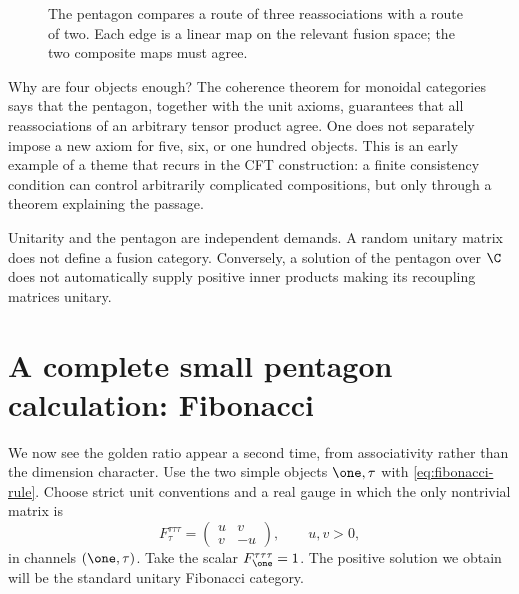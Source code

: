 \begin{figure}[htbp]
\centering
{}
\caption{The pentagon compares a route of three reassociations with
a route of two.  Each edge is a linear map on the relevant fusion
space; the two composite maps must agree.}
\label{fig:associator-pentagon}
\end{figure}

Why are four objects enough?  The coherence theorem for monoidal
categories says that the pentagon, together with the unit axioms,
guarantees that all reassociations of an arbitrary tensor product
agree.  One does not separately impose a new axiom for five, six, or
one hundred objects.  This is an early example of a theme that recurs
in the CFT construction: a finite consistency condition can control
arbitrarily complicated compositions, but only through a theorem
explaining the passage.

Unitarity and the pentagon are independent demands.  A random unitary
matrix does not define a fusion category.  Conversely, a solution of
the pentagon over $\C$ does not automatically supply positive inner
products making its recoupling matrices unitary.

\section{A complete small pentagon calculation: Fibonacci}

We now see the golden ratio appear a second time, from associativity
rather than the dimension character.  Use the two simple objects
$\one,\tau$ with \eqref{eq:fibonacci-rule}.  Choose strict unit
conventions and a real gauge in which the only nontrivial matrix is
\begin{equation}
 F^{\tau\tau\tau}_{\tau}
 =\begin{pmatrix}u&v\\v&-u\end{pmatrix},
 \qquad u,v>0,
 \label{eq:fib-F-unknown}
\end{equation}
in channels $(\one,\tau)$.  Take the scalar
$F^{\tau\tau\tau}_{\one}=1$.  The positive solution we obtain
will be the standard unitary Fibonacci category.


